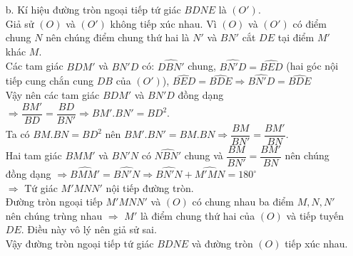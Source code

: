 \begin{ex}
{\begin{enumerate}
		\\ Theo giả thiết $BA=BD \Rightarrow BM.BN=BD^2 \Rightarrow \dfrac{BM}{BD}=\dfrac{BD}{BN}$.
		\\ Mặt khác $\widehat{DBN}$ là góc chung của $\triangle BDM$ và $\triangle BND$.
		\\ Vậy nên $\triangle BDM$ $\backsim$ $\triangle BND$  $\Rightarrow \widehat{BDM} = \widehat{BND}$.
		\\ Ta có $BD=BE \Rightarrow \triangle BDE$ cân tại $B \Rightarrow \widehat{BDM} = \widehat{BED} \Rightarrow \widehat{BND} = \widehat{BED}$.
		\\ $\Rightarrow$ Tứ giác $BDNE$ nội tiếp được trong một đường tròn.
		\item[b.] Kí hiệu đường tròn ngoại tiếp tứ giác $BDNE$ là $(O')$.
		\\ Giả sử $(O)$ và $(O')$ không tiếp xúc nhau. Vì $(O)$ và $(O')$ có điểm chung $N$ nên chúng điểm chung thứ hai là $N'$ và $BN'$ cắt $DE$ tại điểm $M'$ khác $M$.
		\\ Các tam giác $BDM'$ và $BN'D$ có: $\widehat{DBN'}$ chung, $\widehat{BN'D} =\widehat{BED}$ (hai góc nội tiếp cung chắn cung $DB$ của $(O')$), $\widehat{BED} = \widehat{BDE} \Rightarrow \widehat{BN'D}= \widehat{BDE}$
		\\ Vậy nên các tam giác $BDM'$ và $BN'D$ đồng dạng
		\\ $\Rightarrow \dfrac{BM'}{BD}=\dfrac{BD}{BN'}\Rightarrow BM'.BN'=BD^2$.
		\\ Ta có $BM.BN=BD^2$ nên $BM'.BN'=BM.BN \Rightarrow \dfrac{BM}{BN'}=\dfrac{BM'}{BN}$.
		\\ Hai tam giác $BMM'$ và $BN'N$ có $\widehat{NBN'}$ chung và $\dfrac{BM}{BN'}=\dfrac{BM'}{BN}$ nên chúng đồng dạng $\Rightarrow \widehat{BMM'}=\widehat{BN'N} \Rightarrow \widehat{BN'N} + \widehat{M'MN}=180^\circ$
		\\ $\Rightarrow$ Tứ giác $M'MNN'$ nội tiếp đường tròn.
		\\ Đường tròn ngoại tiếp $M'MNN'$ và $(O)$ có chung nhau ba điểm $M,N,N'$ nên chúng trùng nhau $\Rightarrow$ $M'$ là điểm chung thứ hai của $(O)$ và tiếp tuyến $DE$. Điều này vô lý nên giả sử sai.
		\\ Vậy đường tròn ngoại tiếp tứ giác $BDNE$ và đường tròn $(O)$ tiếp xúc nhau.
\end{enumerate}}
\end{ex}
